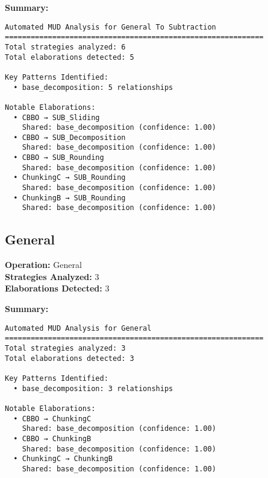 \documentclass{article}
\begin{document}
\textbf{Summary:}\\
\begin{verbatim}
Automated MUD Analysis for General To Subtraction
============================================================
Total strategies analyzed: 6
Total elaborations detected: 5

Key Patterns Identified:
  • base_decomposition: 5 relationships

Notable Elaborations:
  • CBBO → SUB_Sliding
    Shared: base_decomposition (confidence: 1.00)
  • CBBO → SUB_Decomposition
    Shared: base_decomposition (confidence: 1.00)
  • CBBO → SUB_Rounding
    Shared: base_decomposition (confidence: 1.00)
  • ChunkingC → SUB_Rounding
    Shared: base_decomposition (confidence: 1.00)
  • ChunkingB → SUB_Rounding
    Shared: base_decomposition (confidence: 1.00)
\end{verbatim}

\newpage
\subsection{General}

\textbf{Operation:} General\\
\textbf{Strategies Analyzed:} 3\\
\textbf{Elaborations Detected:} 3\\

\begin{center}
\end{center}

\textbf{Summary:}\\
\begin{verbatim}
Automated MUD Analysis for General
============================================================
Total strategies analyzed: 3
Total elaborations detected: 3

Key Patterns Identified:
  • base_decomposition: 3 relationships

Notable Elaborations:
  • CBBO → ChunkingC
    Shared: base_decomposition (confidence: 1.00)
  • CBBO → ChunkingB
    Shared: base_decomposition (confidence: 1.00)
  • ChunkingC → ChunkingB
    Shared: base_decomposition (confidence: 1.00)
\end{verbatim}
\end{document}
